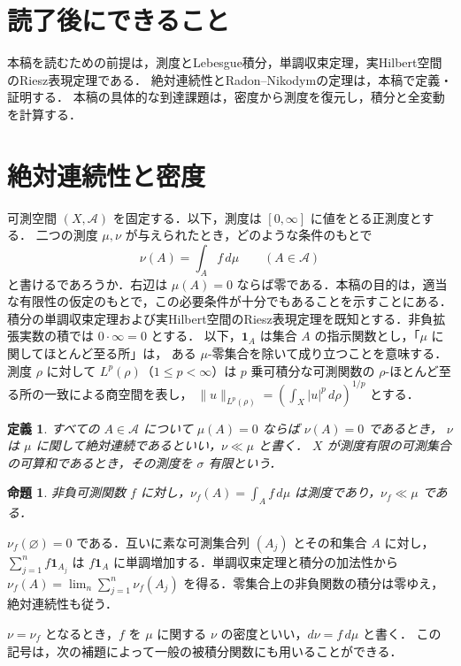 \documentclass[a5paper,10pt,onecolumn]{jsarticle}
\makeatletter
\theoremstyle{mathnotetheorem}
\newtheorem{definition}[theorem]{定義}
\newtheorem{proposition}[theorem]{命題}
\renewcommand{\proofname}{証明}
\renewenvironment{proof}[1][\proofname]{%
  \par\pushQED{\qed}\normalfont\topsep4\p@\@plus2\p@\relax
  \trivlist\item[\hskip\labelsep\bfseries #1]\ignorespaces
}{\popQED\endtrivlist\@endpefalse}
\makeatother
\begin{document}
\section*{読了後にできること}
本稿を読むための前提は，測度とLebesgue積分，単調収束定理，実Hilbert空間のRiesz表現定理である．
絶対連続性とRadon--Nikodymの定理は，本稿で定義・証明する．
本稿の具体的な到達課題は，密度から測度を復元し，積分と全変動を計算する．

\section{絶対連続性と密度}

可測空間 $(X,\mathcal A)$ を固定する．以下，測度は $[0,\infty]$ に値をとる正測度とする．
二つの測度 $\mu,\nu$ が与えられたとき，どのような条件のもとで
\[
             \nu(A)=\int_A f\,d\mu\qquad(A\in\mathcal A)
\]
と書けるであろうか．右辺は $\mu(A)=0$ ならば零である．本稿の目的は，適当な有限性の仮定のもとで，この必要条件が十分でもあることを示すことにある．
積分の単調収束定理および実Hilbert空間のRiesz表現定理を既知とする．非負拡張実数の積では $0\cdot\infty=0$ とする．
以下，$\mathbf1_A$ は集合 $A$ の指示関数とし，「$\mu$ に関してほとんど至る所」は，
ある $\mu$-零集合を除いて成り立つことを意味する．
測度 $\rho$ に対して $L^p(\rho)$（$1\le p<\infty$）は
$p$ 乗可積分な可測関数の $\rho$-ほとんど至る所の一致による商空間を表し，
$\|u\|_{L^p(\rho)}=(\int_X |u|^p\,d\rho)^{1/p}$ とする．

\begin{definition}
すべての $A\in\mathcal A$ について $\mu(A)=0$ ならば $\nu(A)=0$ であるとき，
$\nu$ は $\mu$ に関して絶対連続であるといい，$\nu\ll\mu$ と書く．
$X$ が測度有限の可測集合の可算和であるとき，その測度を $\sigma$ 有限という．
\end{definition}

\begin{proposition}
非負可測関数 $f$ に対し，$\nu_f(A)=\int_A f\,d\mu$ は測度であり，$\nu_f\ll\mu$ である．
\end{proposition}
\begin{proof}
$\nu_f(\varnothing)=0$ である．互いに素な可測集合列 $(A_j)$ とその和集合 $A$ に対し，
$\sum_{j=1}^n f\mathbf1_{A_j}$ は $f\mathbf1_A$ に単調増加する．単調収束定理と積分の加法性から
$\nu_f(A)=\lim_n\sum_{j=1}^n\nu_f(A_j)$ を得る．零集合上の非負関数の積分は零ゆえ，絶対連続性も従う．
\end{proof}

$\nu=\nu_f$ となるとき，$f$ を $\mu$ に関する $\nu$ の密度といい，$d\nu=f\,d\mu$ と書く．
この記号は，次の補題によって一般の被積分関数にも用いることができる．
\end{document}

